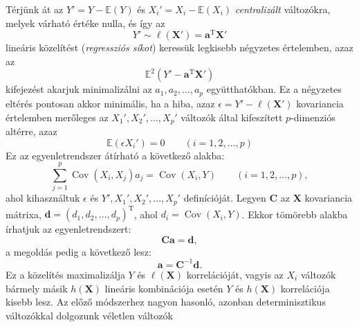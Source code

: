 \documentclass[DIV=15,appendixprefix]{scrreprt}
\theoremstyle{definition}
\theoremstyle{remark}
\newcommand{\mean}{\mathbb{E}}
\DeclareMathOperator{\T}{T}
\DeclareMathOperator{\Cov}{Cov}
\begin{document}
Térjünk át az $ Y' = Y - \mean \left( Y \right) $ és $X_{ i }' = X_{ i } - \mean \left( X_{ i }
\right) $ \emph{centralizált} változókra, melyek várható értéke nulla, és így az
\begin{equation*}
	Y' \sim \ell \left( \mathbf{ X }' \right) = \mathbf{ a }^{ \T } \mathbf{ X }'
\end{equation*}
lineáris közelítést (\emph{regressziós síkot}) keressük legkisebb négyzetes értelemben, azaz az
\begin{equation*}
	\mean^{ 2 } \left( Y' - \mathbf{ a }^{ \T } \mathbf{ X }' \right)
\end{equation*}
kifejezést akarjuk minimalizálni az $ a_{ 1 },{} a_{ 2 },{} \ldots,{} a_{ p } $ együtthatókban. Ez a
négyzetes eltérés pontosan akkor minimális, ha a hiba, azaz $ \epsilon = Y' - \ell \left(
\mathbf{ X }' \right) $ kovariancia értelemben merőleges az $ X_{ 1 }',{} X_{ 2 }',{} \ldots,{}
X_{ p }' $ változók által kifeszített $ p $-dimenziós altérre, azaz
\begin{equation*}
	\mean \left( \epsilon X_{ i }' \right) = 0 \qquad \left( i = 1,{} 2,{} \ldots,{} p \right)
\end{equation*}
Ez az egyenletrendszer átírható a következő alakba:
\begin{equation*}
	\sum_{ j = 1 }^{ p } \Cov \left(X_{ i },{} X_{ j } \right) a_{ j } = \Cov \left(X_{ i },{} Y
	\right) \qquad \left( i = 1,{} 2,{} \ldots,{} p \right),
\end{equation*}
ahol kihasználtuk $ \epsilon $ és $ Y',{} X_{ 1 }',{} X_{ 2 }',{} \ldots,{} X_{ p }' $ definícióját.
Legyen $ \mathbf{ C } $ az $ \mathbf{X} $ kovariancia mátrixa, $ \mathbf{ d } = \left( d_{ 1 },{}
d_{ 2 },{} \ldots,{} d_{ p } \right)^{ \T } $, ahol $ d_{ i }= \Cov \left(X_{ i },{} Y \right)$. Ekkor
tömörebb alakba írhatjuk az egyenletrendszert:
\begin{equation*}
	\mathbf{ C } \mathbf{ a } = \mathbf{ d },
\end{equation*}
a megoldás pedig a következő lesz:
\begin{equation*}
	\mathbf{ a } = \mathbf{ C }^{ - 1 } \mathbf{ d }.
\end{equation*}
Ez a közelítés maximalizálja $ Y $ és $ \ell \left( \mathbf{ X } \right) $ korrelációját, vagyis az
$ X_{ i } $ változók bármely másik $ h \left( \mathbf{ X } \right) $ lineáris kombinációja esetén
$ Y $ és $ h \left( \mathbf{ X } \right) $ korrelációja kisebb lesz.
%
Az előző módszerhez nagyon hasonló, azonban determinisztikus változókkal dolgozunk véletlen változók
\end{document}
